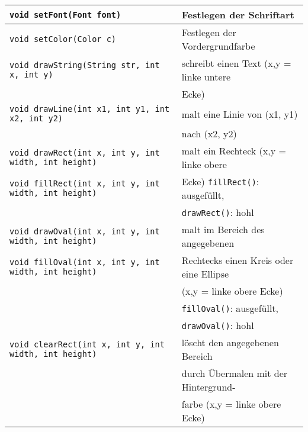 \begin{tabular}{|l|l|}
\hline
\lstinline|void setFont(Font font)| & Festlegen der Schriftart \\ \hline
\lstinline|void setColor(Color c)| & Festlegen der Vordergrundfarbe \\ \hline
\lstinline|void drawString(String str, int x, int y)| & schreibt einen Text (x,y
= linke untere \\ 
 & Ecke) \\ \hline
\lstinline|void drawLine(int x1, int y1, int x2, int y2)| & malt eine Linie von
(x1, y1) \\ 
& nach (x2, y2)  \\ \hline
\lstinline|void drawRect(int x, int y, int width, int height)| & malt ein
Rechteck (x,y = linke obere \\
\lstinline|void fillRect(int x, int y, int width, int height)| &
Ecke) \lstinline|fillRect()|: ausgefüllt, \\
 &  \lstinline|drawRect()|: hohl \\ \hline
\lstinline|void drawOval(int x, int y, int width, int height)| & malt im Bereich
des angegebenen \\
\lstinline|void fillOval(int x, int y, int width, int height)| & Rechtecks
einen Kreis oder eine Ellipse \\
 & (x,y = linke obere Ecke) \\
 & \lstinline|fillOval()|: ausgefüllt, \\ 
 & \lstinline|drawOval()|: hohl \\ \hline
 \lstinline|void clearRect(int x, int y, int width, int height)| & löscht den angegebenen Bereich \\
 & durch Übermalen mit der Hintergrund- \\
 & farbe (x,y = linke obere Ecke) \\ \hline
\end{tabular}